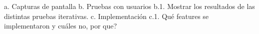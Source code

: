 	a. Capturas de pantalla 
    b. Pruebas con usuarios
	b.1. Mostrar los resultados de las distintas pruebas iterativas.
    c. Implementación
    c.1. Qué features se implementaron y cuáles no, por que?